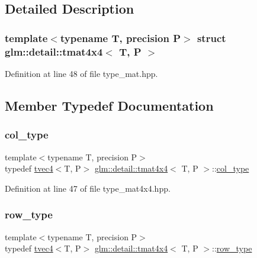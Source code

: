 \subsection{Detailed Description}
\subsubsection*{template$<$typename T, precision P$>$\newline
struct glm\+::detail\+::tmat4x4$<$ T, P $>$}



Definition at line 48 of file type\+\_\+mat.\+hpp.



\subsection{Member Typedef Documentation}
\mbox{\label{structglm_1_1detail_1_1tmat4x4_ade9e794ddd9c2758005f29ddb84e320f}} 
\subsubsection{\texorpdfstring{col\+\_\+type}{col\_type}}
{\footnotesize\ttfamily template$<$typename T, precision P$>$ \\
typedef \hyperlink{structglm_1_1detail_1_1tvec4}{tvec4}$<$T, P$>$ \hyperlink{structglm_1_1detail_1_1tmat4x4}{glm\+::detail\+::tmat4x4}$<$ T, P $>$\+::\hyperlink{structglm_1_1detail_1_1tmat4x4_ade9e794ddd9c2758005f29ddb84e320f}{col\+\_\+type}}



Definition at line 47 of file type\+\_\+mat4x4.\+hpp.

\mbox{\label{structglm_1_1detail_1_1tmat4x4_a5db91d0e5acad7201a6624c595bcb462}} 
\subsubsection{\texorpdfstring{row\+\_\+type}{row\_type}}
{\footnotesize\ttfamily template$<$typename T, precision P$>$ \\
typedef \hyperlink{structglm_1_1detail_1_1tvec4}{tvec4}$<$T, P$>$ \hyperlink{structglm_1_1detail_1_1tmat4x4}{glm\+::detail\+::tmat4x4}$<$ T, P $>$\+::\hyperlink{structglm_1_1detail_1_1tmat4x4_a5db91d0e5acad7201a6624c595bcb462}{row\+\_\+type}}




